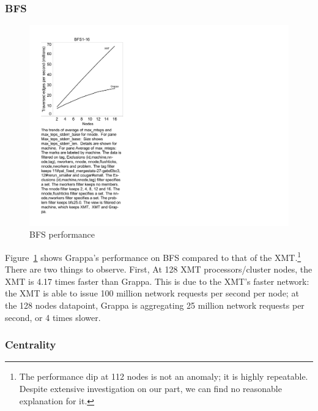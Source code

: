 
\subsubsection{BFS}

\begin{figure}[tH]
\begin{center}
  \includegraphics[width=0.95\columnwidth]{figs/bfs_performance}
\begin{minipage}{0.95\columnwidth}
  \caption{\label{fig:bfs-performance} BFS performance}
\end{minipage}
\vspace{-3ex}
\end{center}
\end{figure}

Figure~\ref{fig:bfs-performance} shows Grappa's performance on BFS
compared to that of the XMT.\footnote{The performance dip at 112 nodes is not an anomaly; it is highly repeatable.  Despite extensive investigation on our part, we can find no reasonable explanation for it.} There are
two things to observe. First, At 128 XMT processors/cluster nodes,
the XMT is  4.17 times faster than Grappa. This is due to the
XMT's faster network: the XMT is able to issue 100 million network
requests per second per node; at the 128 nodes datapoint, Grappa is
aggregating 25 million network requests per second, or 4 times slower.

\subsubsection{Centrality}

